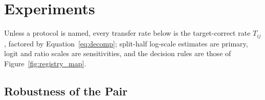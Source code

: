 \section{Experiments}
\label{sec:experiments}

Unless a protocol is named, every transfer rate below is the target-correct rate $T_{ij}$, factored by Equation~\eqref{eq:decomp}; split-half log-scale estimates are primary, logit and ratio scales are sensitivities, and the decision rules are those of Figure~\ref{fig:registry_map}.

\subsection{Robustness of the Pair}
\label{subsec:robustness}

